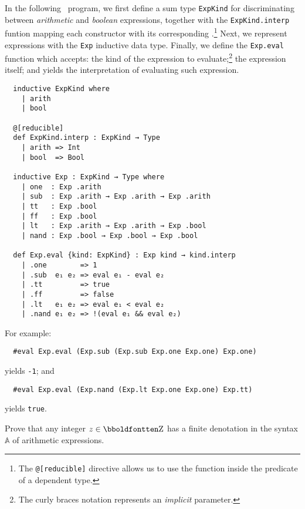 %
\begin{answer}
  In the following \Lean\ program, we first define a sum type
  \texttt{ExpKind} for discriminating between \emph{arithmetic} and
  \emph{boolean} expressions, together with the
  \texttt{ExpKind.interp} funtion mapping each constructor with its
  corresponding \Lean.\footnote{The \texttt{@[reducible]} directive
    allows us to use the function inside the predicate of a dependent
    type.}
  Next, we represent expressions with the \texttt{Exp} inductive
  data type.
  Finally, we define the \texttt{Exp.eval} function which
  accepts: the kind of the expression to evaluate;\footnote{The curly braces notation
    represents an \emph{implicit} parameter.} the expression itself; and yields the interpretation
  of evaluating such expression.
  \begin{lstlisting}
  inductive ExpKind where
    | arith
    | bool
  
  @[reducible]
  def ExpKind.interp : ExpKind → Type
    | arith => Int
    | bool  => Bool
  
  inductive Exp : ExpKind → Type where
    | one  : Exp .arith
    | sub  : Exp .arith → Exp .arith → Exp .arith
    | tt   : Exp .bool
    | ff   : Exp .bool
    | lt   : Exp .arith → Exp .arith → Exp .bool
    | nand : Exp .bool → Exp .bool → Exp .bool
  
  def Exp.eval {kind: ExpKind} : Exp kind → kind.interp
    | .one        => 1
    | .sub  e₁ e₂ => eval e₁ - eval e₂
    | .tt         => true
    | .ff         => false
    | .lt   e₁ e₂ => eval e₁ < eval e₂
    | .nand e₁ e₂ => !(eval e₁ && eval e₂)
  \end{lstlisting}
  
  For example:
  \begin{lstlisting}
  #eval Exp.eval (Exp.sub (Exp.sub Exp.one Exp.one) Exp.one)
  \end{lstlisting}
  yields \texttt{-1}; and
  \begin{lstlisting}
  #eval Exp.eval (Exp.nand (Exp.lt Exp.one Exp.one) Exp.tt)
  \end{lstlisting}
  yields \texttt{true}.
\end{answer}
%
\begin{exercise}{3.8}
  Prove that any integer $z \in \intset$ has a finite denotation in
  the syntax $\mathbb{A}$ of arithmetic expressions.
\end{exercise}
